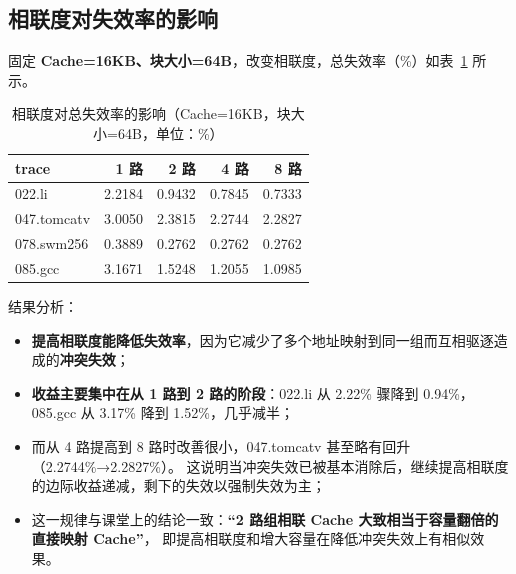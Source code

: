 \documentclass[12pt,a4paper]{ctexart}
\begin{document}
\subsection{相联度对失效率的影响}
固定 \textbf{Cache=16KB、块大小=64B}，改变相联度，总失效率（\%）如表~\ref{tab:assoc} 所示。
\begin{table}[H]
\centering
\caption{相联度对总失效率的影响（Cache=16KB，块大小=64B，单位：\%）}
\label{tab:assoc}
\begin{tabular}{lrrrr}
\toprule
trace & 1 路 & 2 路 & 4 路 & 8 路 \\
\midrule
022.li      & 2.2184 & 0.9432 & 0.7845 & 0.7333 \\
047.tomcatv & 3.0050 & 2.3815 & 2.2744 & 2.2827 \\
078.swm256  & 0.3889 & 0.2762 & 0.2762 & 0.2762 \\
085.gcc     & 3.1671 & 1.5248 & 1.2055 & 1.0985 \\
\bottomrule
\end{tabular}
\end{table}
结果分析：
\begin{itemize}
  \item \textbf{提高相联度能降低失效率}，因为它减少了多个地址映射到同一组而互相驱逐造成的\textbf{冲突失效}；
  \item \textbf{收益主要集中在从 1 路到 2 路的阶段}：022.li 从 2.22\% 骤降到 0.94\%，
        085.gcc 从 3.17\% 降到 1.52\%，几乎减半；
  \item 而从 4 路提高到 8 路时改善很小，047.tomcatv 甚至略有回升（2.2744\%→2.2827\%）。
        这说明当冲突失效已被基本消除后，继续提高相联度的边际收益递减，剩下的失效以强制失效为主；
  \item 这一规律与课堂上的结论一致：\textbf{“2 路组相联 Cache 大致相当于容量翻倍的直接映射 Cache”}，
        即提高相联度和增大容量在降低冲突失效上有相似效果。
\end{itemize}
\end{document}
